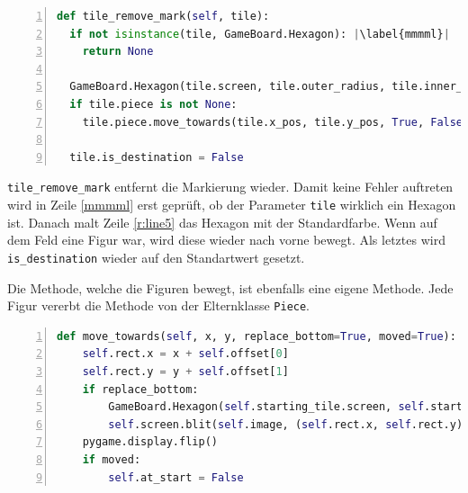 \begin{lstlisting}[language=python,caption={Markierung aufheben},captionpos=b,label={lst:hexa:aufheben},numbers=left,frame=none,escapechar=|]
def tile_remove_mark(self, tile):
  if not isinstance(tile, GameBoard.Hexagon): |\label{mmmml}|
    return None

  GameBoard.Hexagon(tile.screen, tile.outer_radius, tile.inner_radius,tile.x_pos, tile.y_pos)|\label{r:line5}|
  if tile.piece is not None:
    tile.piece.move_towards(tile.x_pos, tile.y_pos, True, False)
        
  tile.is_destination = False
\end{lstlisting}

\texttt{tile\_remove\_mark} entfernt die Markierung wieder. Damit keine Fehler auftreten wird in Zeile \ref{mmmml} erst geprüft, ob der Parameter \texttt{tile} wirklich ein Hexagon ist. Danach malt Zeile \ref{r:line5} das Hexagon mit der Standardfarbe. Wenn auf dem Feld eine Figur war, wird diese wieder nach vorne bewegt. Als letztes wird \texttt{is\_destination} wieder auf den Standartwert gesetzt.

Die Methode, welche die Figuren bewegt, ist ebenfalls eine eigene Methode. Jede Figur vererbt die Methode von der Elternklasse \texttt{Piece}.

\begin{lstlisting}[language=python,caption={Figur bewegen},captionpos=b,label={lst:hexa:bewegen},numbers=left,frame=none,escapechar=|]
def move_towards(self, x, y, replace_bottom=True, moved=True):
    self.rect.x = x + self.offset[0]
    self.rect.y = y + self.offset[1]
    if replace_bottom:
        GameBoard.Hexagon(self.starting_tile.screen, self.starting_tile.outer_radius, self.starting_tile.inner_radius, self.starting_tile.x_pos, self.starting_tile.y_pos) 
        self.screen.blit(self.image, (self.rect.x, self.rect.y))
    pygame.display.flip()
    if moved:
        self.at_start = False

\end{lstlisting}

